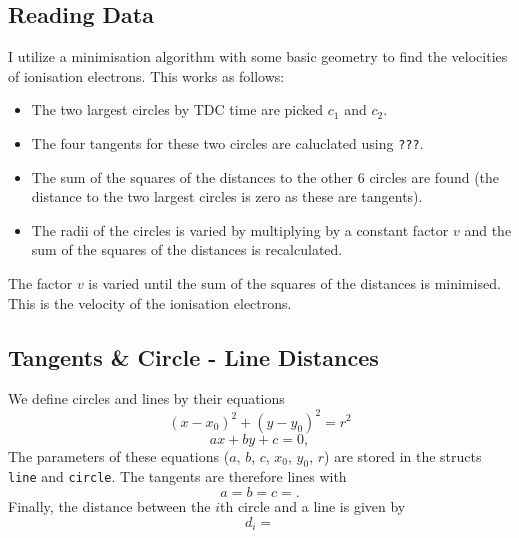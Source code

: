 \documentclass[11pt]{article}
\begin{document}
\subsection{Reading Data}
\label{sec:reading}


I utilize a minimisation algorithm with some basic geometry to find the velocities of ionisation electrons. This works as follows:
\begin{itemize}
    \item The two largest circles by TDC time are picked $c_1$ and $c_2$.
    \item The four tangents for these two circles are caluclated using \texttt{???}.
    \item The sum of the squares of the distances to the other 6 circles are found (the distance to the two largest circles is zero as these are tangents).
    \item The radii of the circles is varied by multiplying by a constant factor $v$ and the sum of the squares of the distances is recalculated.
\end{itemize}
The factor $v$ is varied until the sum of the squares of the distances is minimised. This is the velocity of the ionisation electrons.

\subsection{Tangents \& Circle - Line Distances}
\label{sec:tangents}
We define circles and lines by their equations
\begin{equation}
    (x - x_0)^2 + (y - y_0)^2 = r^2
    \label{eq:circle}
\end{equation}
\begin{equation}
    ax + by + c = 0,
    \label{eq:line}
\end{equation}
The parameters of these equations ($a$, $b$, $c$, $x_0$, $y_0$, $r$) are stored in the structs \texttt{line} and \texttt{circle}. The tangents are therefore lines with
\begin{equation}
    a = 
    b = 
    c = .
    \label{eq:tangents}
\end{equation}
Finally, the distance between the $i$th circle and a line is given by
\begin{equation}
    d_i = 
    \label{eq:dist}
\end{equation}
\end{document}
